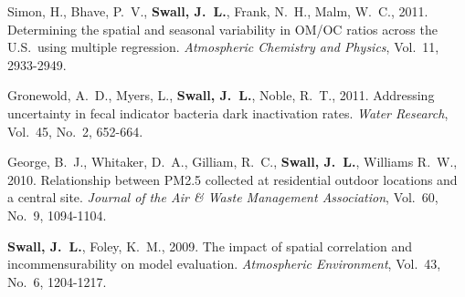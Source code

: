 \documentclass[11pt]{article}
\begin{document}
\begin{list}{. }
{
\setlength{\topsep}{0em}
\setlength{\labelsep}{0em}
\setlength{\labelwidth}{0em}
\setlength{\itemindent}{0em}
\setlength{\leftmargin}{0cm}
\setlength{\itemsep}{0cm}
}
\item Simon, H., Bhave, P.~V., \textbf{Swall, J.~L.}, Frank, N.~H.,
Malm, W.~C., 2011.  Determining the spatial and seasonal variability in OM/OC
ratios across the U.S.~using multiple regression. \textit{Atmospheric
  Chemistry and Physics}, Vol.~11, 2933-2949.  %

\item Gronewold, A.~D., Myers, L., \textbf{Swall, J.~L.}, Noble, R.~T., 2011. 
Addressing uncertainty in fecal indicator bacteria dark inactivation rates.
\textit{Water Research}, Vol.~45, No.~2, 652-664.  %

\item George, B.~J., Whitaker, D.~A., Gilliam, R.~C., \textbf{Swall,
J.~L.}, Williams R.~W., 2010. Relationship between PM2.5 collected at
residential outdoor locations and a central site. \textit{Journal of
the Air \& Waste Management Association}, Vol.~60, No.~9, 1094-1104.

\item \textbf{Swall, J.~L.}, Foley, K.~M., 2009.  The impact of spatial
correlation and incommensurability on model evaluation.
\textit{Atmospheric Environment}, Vol.~43, No.~6, 1204-1217.





\end{list}
\end{document}
